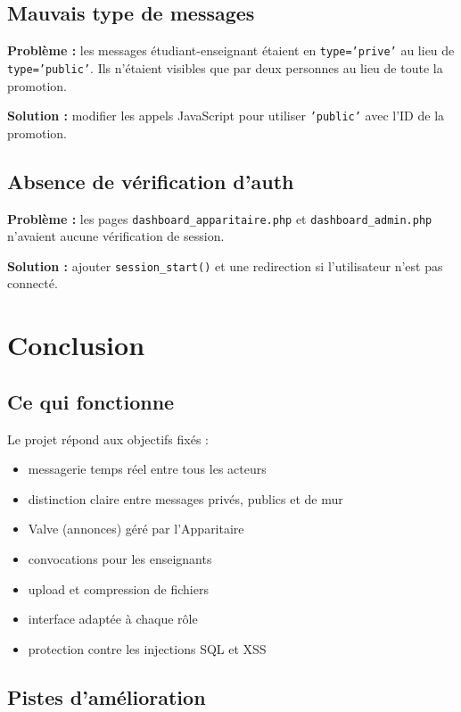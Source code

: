 \documentclass[12pt,a4paper]{article}
\begin{document}
\subsection{Mauvais type de messages}

\textbf{Probl\`eme :} les messages \'etudiant-enseignant \'etaient en
\texttt{type='prive'} au lieu de \texttt{type='public'}. Ils n'\'etaient
visibles que par deux personnes au lieu de toute la promotion.

\textbf{Solution :} modifier les appels JavaScript pour utiliser
\texttt{'public'} avec l'ID de la promotion.

\subsection{Absence de v\'erification d'auth}

\textbf{Probl\`eme :} les pages \texttt{dashboard\_apparitaire.php} et
\texttt{dashboard\_admin.php} n'avaient aucune v\'erification de session.

\textbf{Solution :} ajouter \texttt{session\_start()} et une redirection si
l'utilisateur n'est pas connect\'e.

\section{Conclusion}

\subsection{Ce qui fonctionne}

Le projet r\'epond aux objectifs fix\'es :
\begin{itemize}
    \item messagerie temps r\'eel entre tous les acteurs
    \item distinction claire entre messages priv\'es, publics et de mur
    \item Valve (annonces) g\'er\'e par l'Apparitaire
    \item convocations pour les enseignants
    \item upload et compression de fichiers
    \item interface adapt\'ee \`a chaque r\^ole
    \item protection contre les injections SQL et XSS
\end{itemize}

\subsection{Pistes d'am\'elioration}
\end{document}
